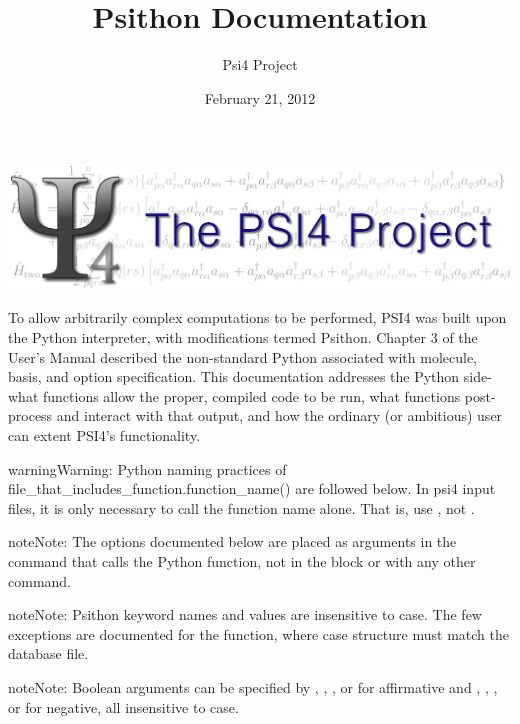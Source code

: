 \documentclass[letterpaper,10pt,english]{sphinxmanual}
\title{Psithon Documentation}
\date{February 21, 2012}
\author{Psi4 Project}
\begin{document}
\maketitle
\tableofcontents
{}\label{index::doc}
\includegraphics[width=1.000\linewidth]{PSI4_3.png}



To allow arbitrarily complex computations to be performed, PSI4 was built
upon the Python interpreter, with modifications termed Psithon. Chapter 3
of the User's Manual described the non-standard Python associated with
molecule, basis, and option specification. This documentation addresses
the Python side- what functions allow the proper, compiled code to be run,
what functions post-process and interact with that output, and how the
ordinary (or ambitious) user can extent PSI4's functionality.

\begin{notice}{warning}{Warning:}
Python naming practices of file\_that\_includes\_function.function\_name()
are followed below. In psi4 input files, it is only necessary to call the
function name alone. That is, use , not .
\end{notice}

\begin{notice}{note}{Note:}
The options documented below are placed as arguments in the command that
calls the Python function, not in the  block or with any
other  command.
\end{notice}

\begin{notice}{note}{Note:}
Psithon keyword names and values are insensitive to case. The few
exceptions are documented for the  function, where case
structure must match the database file.
\end{notice}

\begin{notice}{note}{Note:}
Boolean arguments can be specified by , , , or 
for affirmative and , , , or  for negative,
all insensitive to case.
\end{notice}
\end{document}
